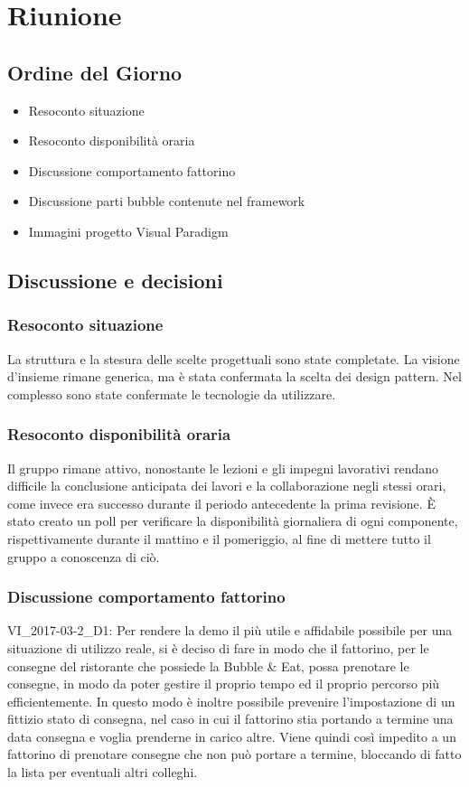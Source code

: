 \section{Riunione}
\subsection{Ordine del Giorno}
\begin{itemize}
	\item Resoconto situazione
	\item Resoconto disponibilità oraria
	\item Discussione comportamento fattorino
	\item Discussione parti bubble contenute nel framework 
	\item Immagini progetto Visual Paradigm
\end{itemize}

\subsection{Discussione e decisioni}

\subsubsection{Resoconto situazione}
La struttura e la stesura delle scelte progettuali sono state completate. La visione d'insieme rimane generica, ma è stata confermata la scelta dei design pattern. Nel complesso sono state confermate le tecnologie da utilizzare.

\subsubsection{Resoconto disponibilità oraria}
Il gruppo rimane attivo, nonostante le lezioni e gli impegni lavorativi rendano difficile la conclusione anticipata dei lavori e la collaborazione negli stessi orari, come invece era successo durante il periodo antecedente la prima revisione. È stato creato un poll per verificare la disponibilità giornaliera di ogni componente, rispettivamente durante il mattino e il pomeriggio, al fine di mettere tutto il gruppo a conoscenza di ciò.

\subsubsection{Discussione comportamento fattorino}
VI\_2017-03-2\_D1: Per rendere la demo il più utile e affidabile possibile per una situazione di utilizzo reale, si è deciso di fare in modo che il fattorino, per le consegne del ristorante che possiede la Bubble \& Eat, possa prenotare le consegne, in modo da poter gestire il proprio tempo ed il proprio percorso più efficientemente. In questo modo è inoltre possibile prevenire l'impostazione di un fittizio stato di consegna, nel caso in cui il fattorino stia portando a termine una data consegna e voglia prenderne in carico altre. Viene quindi così impedito a un fattorino di prenotare consegne che non può portare a termine, bloccando di fatto la lista per eventuali altri colleghi.

